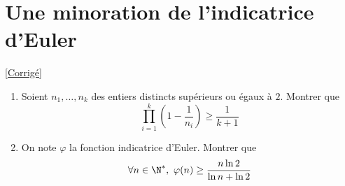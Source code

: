 \documentclass[8pt]{book}
\begin{document}
\section{Une minoration de l'indicatrice d'Euler }
\label{Une minoration de l'indicatrice d'Euler}
\textcolor{blue}{\hyperref[Une minoration de l'indicatrice d'Euler corrigé]{[Corrigé]}}\\
\begin{enumerate}[leftmargin=*]
	\item Soient $n_1,\dots,n_k$ des entiers distincts supérieurs ou égaux à $2$. Montrer que
	$$\prod\limits_{i=1}^{k}{\left( 1-\frac{1}{n_i}\right)}\geq \frac{1}{k+1}$$
	\item On note $\varphi$ la fonction indicatrice d'Euler. Montrer que
	$$\forall n\in \N^*,\ \varphi(n)\geq \frac{n\ln{2}}{\ln{n}+\ln{2}}$$
\end{enumerate}
\end{document}
